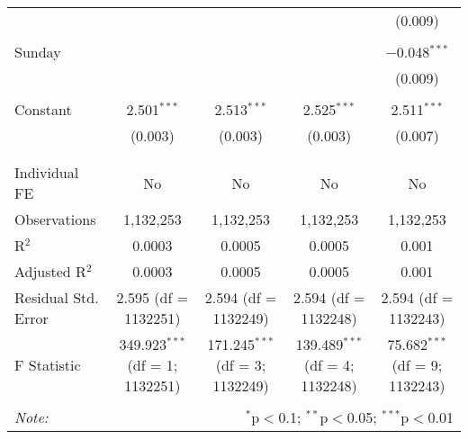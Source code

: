 \documentclass[
]{article}
\begin{document}
\begin{table}[!htbp]
{\begin{tabular}{@{\extracolsep{5pt}}lcccc}
  &  &  &  & (0.009) \\ 
  & & & & \\ 
 Sunday &  &  &  & $-$0.048$^{***}$ \\ 
  &  &  &  & (0.009) \\ 
  & & & & \\ 
 Constant & 2.501$^{***}$ & 2.513$^{***}$ & 2.525$^{***}$ & 2.511$^{***}$ \\ 
  & (0.003) & (0.003) & (0.003) & (0.007) \\ 
  & & & & \\ 
\hline \\[-1.8ex] 
Individual FE & No & No & No & No \\ 
Observations & 1,132,253 & 1,132,253 & 1,132,253 & 1,132,253 \\ 
R$^{2}$ & 0.0003 & 0.0005 & 0.0005 & 0.001 \\ 
Adjusted R$^{2}$ & 0.0003 & 0.0005 & 0.0005 & 0.001 \\ 
Residual Std. Error & 2.595 (df = 1132251) & 2.594 (df = 1132249) & 2.594 (df = 1132248) & 2.594 (df = 1132243) \\ 
F Statistic & 349.923$^{***}$ (df = 1; 1132251) & 171.245$^{***}$ (df = 3; 1132249) & 139.489$^{***}$ (df = 4; 1132248) & 75.682$^{***}$ (df = 9; 1132243) \\ 
\hline 
\hline \\[-1.8ex] 
\textit{Note:}  & \multicolumn{4}{r}{$^{*}$p$<$0.1; $^{**}$p$<$0.05; $^{***}$p$<$0.01} \\ 
\end{tabular}
} 
\end{table} 
\newpage
\end{document}
